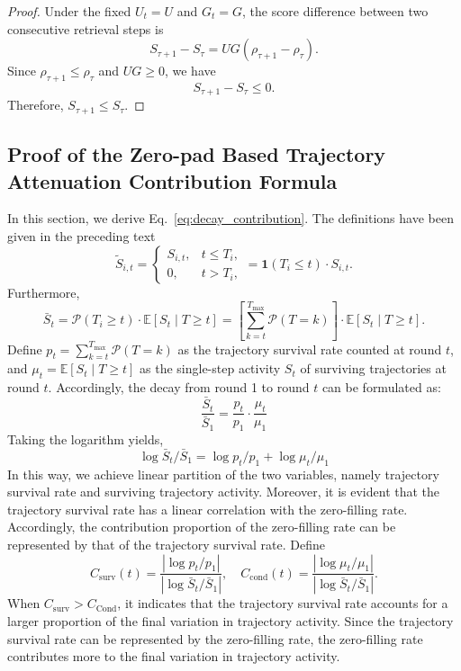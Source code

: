 \documentclass{article} %
\begin{document}
\begin{proof}
Under the fixed $U_t=U$ and $G_t=G$, the score difference between two consecutive retrieval steps is
\[
S_{\tau+1}-S_{\tau}
=
UG(\rho_{\tau+1}-\rho_{\tau}).
\]
Since $\rho_{\tau+1}\le \rho_{\tau}$ and $UG\ge 0$, we have
\[
S_{\tau+1}-S_{\tau}\le 0.
\]
Therefore, $S_{\tau+1}\le S_{\tau}$.
\end{proof}
\subsection{Proof of the Zero-pad Based Trajectory Attenuation Contribution Formula}
In this section, we derive Eq.~\ref{eq:decay_contribution}. The definitions have been given in the preceding text
\[
\widetilde{S}_{i,t}=
\begin{cases}
S_{i,t}, & t\le T_i,\\
0, & t>T_i,
\end{cases}=\mathbf{1}\left(T_i\leq t\right)\cdot S_{i,t}.
\]
Furthermore,
\begin{equation}
    \bar{S}_t=\mathcal{P}(T_i\geq t)\cdot \mathbb{E}\left[S_t\mid T\geq t\right]=\left[\sum\limits_{k=t}^{T_{\mathrm{max}}}\mathcal{P}\left(T=k\right)\right]\cdot \mathbb{E}\left[S_t\mid T\geq t\right].
\end{equation}
Define $p_t=\sum\limits_{k=t}^{T_{\mathrm{max}}}\mathcal{P}\left(T=k\right)$ as the trajectory survival rate counted at round $t$, and $\mu_t=\mathbb{E}\left[S_t\mid T\geq t\right]$ as the single-step activity $S_t$ of surviving trajectories at round $t$. Accordingly, the decay from round 1 to round $t$ can be formulated as:
\begin{equation}
    \dfrac{\bar S_t}{\bar S_1}=\dfrac{p_t}{p_1}\cdot\dfrac{\mu_t}{\mu_1}
\end{equation}
Taking the logarithm yields,
\begin{equation}
    \log \bar S_t/\bar S_1=\log p_t / p_1 + \log \mu_t /\mu_1
\end{equation}
In this way, we achieve linear partition of the two variables, namely trajectory survival rate and surviving trajectory activity. Moreover, it is evident that the trajectory survival rate has a linear correlation with the zero-filling rate. Accordingly, the contribution proportion of the zero-filling rate can be represented by that of the trajectory survival rate. Define
\begin{equation}
C_{\mathrm{surv}}(t)
=
\frac{
\left|\log p_t/p_1\right|
}{
\left|\log \bar S_t/\bar S_1\right|
},
\quad
C_{\mathrm{cond}}(t)
=
\frac{
\left|\log \mu_t/\mu_1\right|
}{
\left|\log \bar S_t/\bar S_1\right|
}.
\end{equation}
When $C_{\mathrm{surv}}>C_{\mathrm{Cond}}$, it indicates that the trajectory survival rate accounts for a larger proportion of the final variation in trajectory activity. Since the trajectory survival rate can be represented by the zero-filling rate, the zero-filling rate contributes more to the final variation in trajectory activity.
\end{document}
